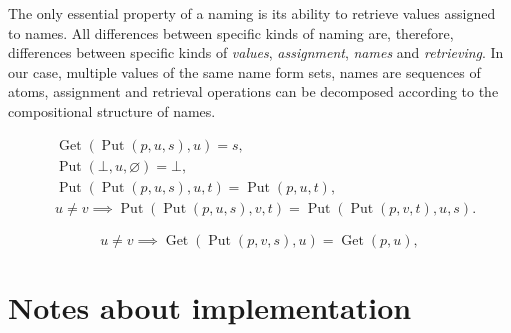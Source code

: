 \documentclass{article}
\theoremstyle{definition}
\newcommand{\deref}{\operatorname{Get}}
\newcommand{\putval}{\operatorname{Put}}
\begin{document}
The only essential property of a naming is its ability to retrieve values
assigned to names. All differences between specific kinds of naming are,
therefore, differences between specific kinds of \emph{values},
\emph{assignment}, \emph{names} and \emph{retrieving}.  In our case, multiple
values of the same name form sets, names are sequences of atoms, assignment and
retrieval operations can be decomposed according to the compositional structure
of names.


\begin{eqnarray*}
  & \deref(\putval(p, u, s), u) = s, \\
  & \putval(\bot, u, \varnothing) = \bot , \\
  & \putval(\putval(p, u, s), u, t) = \putval(p, u, t), \\
  & u \neq v \implies \putval(\putval(p, u, s), v, t) = \putval(\putval(p, v, t), u, s).
\end{eqnarray*}

\[
  u \neq v \implies \deref(\putval(p, v, s), u) = \deref(p, u),
\]

\section{Notes about implementation}
\end{document}
